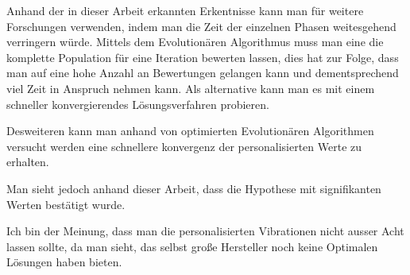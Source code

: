 Anhand der in dieser Arbeit erkannten Erkentnisse kann man für weitere Forschungen verwenden, indem man die Zeit der einzelnen Phasen weitesgehend verringern würde. 
Mittels dem Evolutionären Algorithmus muss man eine die komplette Population für eine Iteration bewerten lassen, dies hat zur Folge, dass man auf eine hohe Anzahl an Bewertungen gelangen kann und dementsprechend viel Zeit in Anspruch nehmen kann.
Als alternative kann man es mit einem schneller konvergierendes Lösungsverfahren probieren. 

Desweiteren kann man anhand von optimierten Evolutionären Algorithmen versucht werden eine schnellere konvergenz der personalisierten Werte zu erhalten. 

Man sieht jedoch anhand dieser Arbeit, dass die Hypothese mit signifikanten Werten bestätigt wurde.

Ich bin der Meinung, dass man die personalisierten Vibrationen nicht ausser Acht lassen sollte, da man sieht, das selbst große Hersteller noch keine Optimalen Lösungen haben bieten. 



